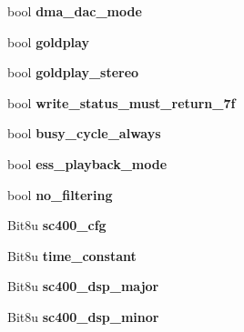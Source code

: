 \begin{DoxyCompactItemize}
\item 
\hypertarget{structSB__INFO_aed1dfb3b027b7a79b88d753502b2da4b}{bool {\bfseries dma\-\_\-dac\-\_\-mode}}\label{structSB__INFO_aed1dfb3b027b7a79b88d753502b2da4b}

\item 
\hypertarget{structSB__INFO_adc91aadc460dbdfe303d61c7058fc72d}{bool {\bfseries goldplay}}\label{structSB__INFO_adc91aadc460dbdfe303d61c7058fc72d}

\item 
\hypertarget{structSB__INFO_ab4c2f886b10eeda8114e0ce3ce9e25be}{bool {\bfseries goldplay\-\_\-stereo}}\label{structSB__INFO_ab4c2f886b10eeda8114e0ce3ce9e25be}

\item 
\hypertarget{structSB__INFO_a2edc8d6fce1563c9f156c45b9c6b2ed9}{bool {\bfseries write\-\_\-status\-\_\-must\-\_\-return\-\_\-7f}}\label{structSB__INFO_a2edc8d6fce1563c9f156c45b9c6b2ed9}

\item 
\hypertarget{structSB__INFO_a60379dc9b0c9952000cfb0c5aef82dbc}{bool {\bfseries busy\-\_\-cycle\-\_\-always}}\label{structSB__INFO_a60379dc9b0c9952000cfb0c5aef82dbc}

\item 
\hypertarget{structSB__INFO_a92085802b58cdfa3b6c8a508f62d979b}{bool {\bfseries ess\-\_\-playback\-\_\-mode}}\label{structSB__INFO_a92085802b58cdfa3b6c8a508f62d979b}

\item 
\hypertarget{structSB__INFO_a17987cf1ab74b0cbac659e7d954621db}{bool {\bfseries no\-\_\-filtering}}\label{structSB__INFO_a17987cf1ab74b0cbac659e7d954621db}

\item 
\hypertarget{structSB__INFO_a11647adf58cef8eee7e3ac88018a5f33}{Bit8u {\bfseries sc400\-\_\-cfg}}\label{structSB__INFO_a11647adf58cef8eee7e3ac88018a5f33}

\item 
\hypertarget{structSB__INFO_afd4fbdf9ce6a801a959f05e8cc8e0291}{Bit8u {\bfseries time\-\_\-constant}}\label{structSB__INFO_afd4fbdf9ce6a801a959f05e8cc8e0291}

\item 
\hypertarget{structSB__INFO_ac540ef5e4826d09eb4108723dc8e222f}{Bit8u {\bfseries sc400\-\_\-dsp\-\_\-major}}\label{structSB__INFO_ac540ef5e4826d09eb4108723dc8e222f}

\item 
\hypertarget{structSB__INFO_accb2b941c63c67f65dd759c373907c03}{Bit8u {\bfseries sc400\-\_\-dsp\-\_\-minor}}\label{structSB__INFO_accb2b941c63c67f65dd759c373907c03}


\end{DoxyCompactItemize}
